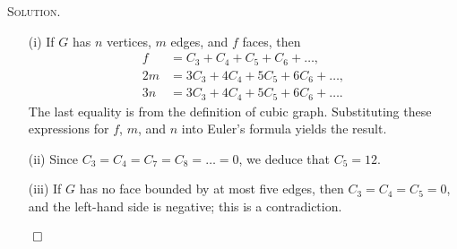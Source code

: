 \documentclass[12pt, a4paper, oneside]{ctexart}
\newenvironment{solution}{%
	\par\noindent\textsc{Solution. }\ignorespaces
}{%
	\hfill$\qed$\par
}
\begin{document}
    \begin{solution}
        \begin{enumerate}
            \item[(i)] If $G$ has $n$ vertices, $m$ edges, and $f$ faces, then
            \begin{align*}
                f &= C_3 + C_4 + C_5 + C_6 + \dots, \\
                2m &= 3C_3 + 4C_4 + 5C_5 + 6C_6 + \dots, \\
                3n &= 3C_3 + 4C_4 + 5C_5 + 6C_6 + \dots.
            \end{align*}
            The last equality is from the definition of cubic graph.
            Substituting these expressions for $f$, $m$, and $n$ into Euler's formula yields the result.
        
            \item[(ii)] Since $C_3 = C_4 = C_7 = C_8 = \dots = 0$, we deduce that $C_5 = 12$.
        
            \item[(iii)] If $G$ has no face bounded by at most five edges, then $C_3 = C_4 = C_5 = 0$, and the left-hand side is negative; this is a contradiction.
        \end{enumerate}
        
    \end{solution}
\end{document}
